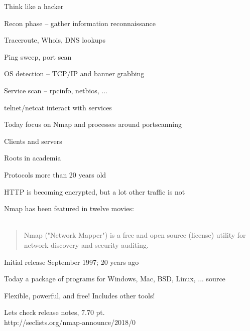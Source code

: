 \documentclass[Screen16to9,17pt]{foils}
\begin{document}
\begin{list1}
\item Think like a hacker
\item Recon phase -- gather information reconnaissance
\begin{list2}
\item Traceroute, Whois, DNS lookups
\item Ping sweep, port scan
\item OS detection -- TCP/IP and banner grabbing
\item Service scan -- rpcinfo, netbios, ...
\item telnet/netcat interact with services
\end{list2}
\end{list1}

\centerline{Today focus on Nmap and processes around portscanning}




\begin{list1}
\item Clients and servers
\item Roots in academia
\item Protocols more than 20 years old
\item HTTP is becoming encrypted, but a lot other traffic is not
\end{list1}


Nmap has been featured in twelve movies:\\
\\



\begin{quote}
Nmap ("Network Mapper") is a free and open source (license) utility for network discovery and security auditing.
\end{quote}

\begin{list1}
\item Initial release September 1997; 20 years ago
\item Today a package of programs for Windows, Mac, BSD, Linux, ... source
\item Flexible, powerful, and free! Includes other tools!
\item Lets check release notes, 7.70 pt.\\
http://seclists.org/nmap-announce/2018/0
\end{list1}
\end{document}
